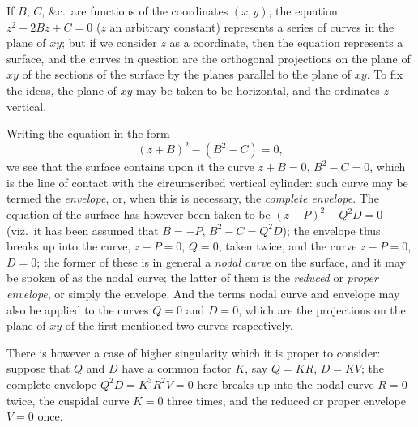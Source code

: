\documentclass[11pt,a4paper]{article}
\begin{document}
If $B$, $C$, \&c.\ are functions of the coordinates $(x,y)$, the equation $z^2 + 2Bz + C = 0$ ($z$ an arbitrary constant) represents a series of curves in the plane of $xy$; but if we consider $z$ as a coordinate, then the equation represents a surface, and the curves in question are the orthogonal projections on the plane of $xy$ of the sections of the surface by the planes parallel to the plane of $xy$. To fix the ideas, the plane of $xy$ may be taken to be horizontal, and the ordinates $z$ vertical.

Writing the equation in the form
\[
(z+B)^2 - (B^2-C) = 0,
\]
we see that the surface contains upon it the curve $z+B=0$, $B^2-C=0$, which is the line of contact with the circumscribed vertical cylinder: such curve may be termed the \emph{envelope}, or, when this is necessary, the \emph{complete envelope}. The equation of the surface has however been taken to be $(z-P)^2 - Q^2 D = 0$ (viz.\ it has been assumed that $B=-P$, $B^2-C=Q^2 D$); the envelope thus breaks up into the curve, $z-P=0$, $Q=0$, taken twice, and the curve $z-P=0$, $D=0$; the former of these is in general a \emph{nodal curve} on the surface, and it may be spoken of as the nodal curve; the latter of them is the \emph{reduced} or \emph{proper envelope}, or simply the envelope. And the terms nodal curve and envelope may also be applied to the curves $Q=0$ and $D=0$, which are the projections on the plane of $xy$ of the first-mentioned two curves respectively.

There is however a case of higher singularity which it is proper to consider: suppose that $Q$ and $D$ have a common factor $K$, say $Q = KR$, $D = KV$; the complete envelope $Q^2 D = K^3 R^2 V = 0$ here breaks up into the nodal curve $R=0$ twice, the cuspidal curve $K=0$ three times, and the reduced or proper envelope $V=0$ once.
\end{document}
